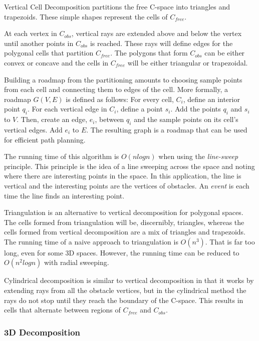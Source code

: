\documentclass[10pt,conference]{ieeeconf}
\begin{document}
Vertical Cell Decomposition \cite{vert_cell_decomp} partitions the free C-space into triangles and trapezoids. These simple shapes represent the cells of $C_{free}$. 

At each vertex in $C_{obs}$, vertical rays are extended above and below the vertex until another points in $C_{obs}$ is reached. These rays will define edges for the polygonal cells that partition $C_{free}$. The polygons that form $C_{obs}$ can be either convex or concave and the cells in $C_{free}$ will be either triangular or trapezoidal. 

Building a roadmap from the partitioning amounts to choosing sample points from each cell and connecting them to edges of the cell. More formally, a roadmap $G(V,E)$ is defined as follows: For every cell, $C_i$, define an interior point $q_i$. For each vertical edge in $C_i$, define a point $s_i$. Add the points $q_i$ and $s_i$ to $V$. Then, create an edge, $e_i$, between $q_i$ and the sample points on its cell's vertical edges. Add $e_i$ to $E$. The resulting graph is a roadmap that can be used for efficient path planning.

The running time of this algorithm is $O(nlogn)$ when using the \emph{line-sweep} principle. This principle is the idea of a line sweeping across the space and noting where there are interesting points in the space. In this application, the line is vertical and the interesting points are the vertices of obstacles. An \emph{event} is each time the line finds an interesting point. 

Triangulation is an alternative to vertical decomposition for polygonal spaces. The cells formed from triangulation will be, discernibly, triangles, whereas the cells formed from vertical decomposition are a mix of triangles and trapezoids. The running time of a naive approach to triangulation is $O(n^3)$. That is far too long, even for some 3D spaces. However, the running time can be reduced to $O(n^2logn)$ with radial sweeping.

Cylindrical decomposition is similar to vertical decomposition in that it works by extending rays from all the obstacle vertices, but in the cylindrical method the rays do not stop until they reach the boundary of the C-space. This results in cells that alternate between regions of $C_{free}$ and $C_{obs}$. 

\subsubsection{3D Decomposition}
\end{document}
